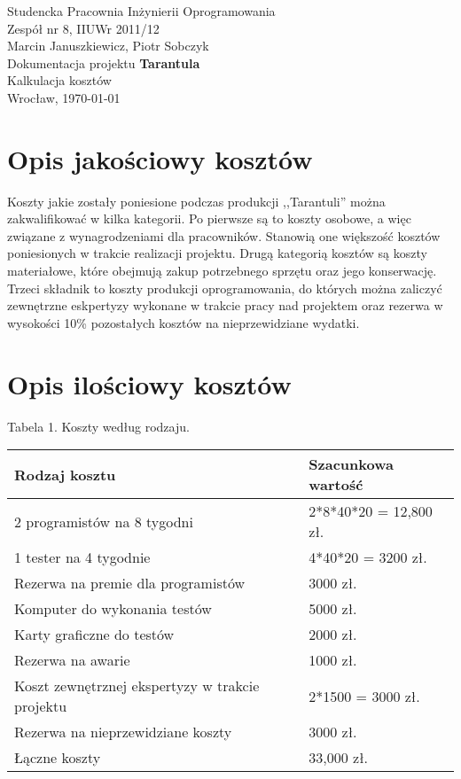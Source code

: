 \documentclass[11pt,leqno]{article}
\begin{document}
 



\begin{center}
\thispagestyle{empty}
{\Large Studencka Pracownia Inżynierii Oprogramowania}\\[0.5cm]
{\Large Zespół nr 8, IIUWr 2011/12}\\[2.5cm]

{Marcin Januszkiewicz, Piotr Sobczyk}\\[0.5cm]
{\huge Dokumentacja projektu \textbf{Tarantula}}\\[0.25cm]
{ Kalkulacja kosztów}\\[0.5cm]
\vfill
{\large Wrocław, \today}
\end{center}

\newpage
\tableofcontents
\newpage

\section{Opis jakościowy kosztów}

Koszty jakie zostały poniesione podczas produkcji ,,Tarantuli'' można zakwalifikować w kilka kategorii. 
Po pierwsze są to koszty osobowe, a więc związane z wynagrodzeniami dla pracowników. Stanowią one
większość kosztów poniesionych w trakcie realizacji projektu. Drugą kategorią kosztów są koszty materiałowe, które obejmują zakup potrzebnego sprzętu 
oraz jego konserwację. Trzeci składnik to koszty produkcji oprogramowania, do których można zaliczyć zewnętrzne eskpertyzy wykonane w trakcie pracy nad projektem oraz 
rezerwa w wysokości 10\% pozostałych kosztów na nieprzewidziane wydatki.

\section{Opis ilościowy kosztów}


\vspace{1 cm}
{\small Tabela 1. Koszty według rodzaju.}
\hspace{-1.5cm}

 \begin{tabular}{|p{10cm}|p{2cm}|}
  \hline
 Rodzaj kosztu & Szacunkowa wartość  \\ \hline
  2 programistów na 8 tygodni & 2*8*40*20 = 12,800 zł. \\ \hline
 1 tester na 4 tygodnie & 4*40*20 = 3200 zł. \\ \hline
Rezerwa na premie dla programistów & 3000 zł. \\ \hline
 Komputer do wykonania testów & 5000 zł. \\ \hline
 Karty graficzne do testów & 2000 zł. \\ \hline
Rezerwa na awarie & 1000 zł. \\ \hline
 Koszt zewnętrznej ekspertyzy w trakcie projektu & 2*1500 = 3000 zł. \\ \hline
Rezerwa na nieprzewidziane koszty & 3000 zł. \\ \hline
Łączne koszty & 33,000 zł. \\ \hline
 \end{tabular}
\end{document}
